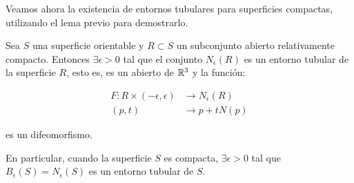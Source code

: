 Veamos ahora la existencia de entornos tubulares para superficies compactas, utilizando el lema previo para demostrarlo.

\begin{theorem}
Sea $S$ una superficie orientable y $R \subset S$ un subconjunto abierto relativamente compacto. Entonces $\exists \epsilon > 0$ tal que el conjunto $N_\epsilon(R)$ es un entorno tubular de la superficie $R$, esto es, es un abierto de $\mathbb{R}^3$ y la función:

\begin{align*}
    F: R \times (-\epsilon, \epsilon) &\longrightarrow N_\epsilon(R) \\
    (p,t) &\longrightarrow p + tN(p)
\end{align*}

es un difeomorfismo.

En particular, cuando la superficie $S$ es compacta, $\exists \epsilon > 0$ tal que
$B_\epsilon(S)=N_\epsilon(S)$ es un entorno tubular de $S$.
\end{theorem}
